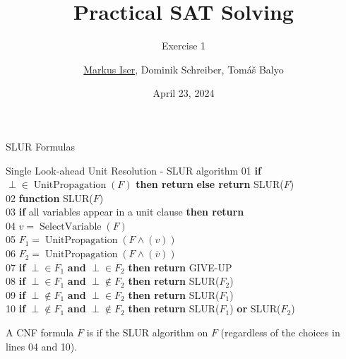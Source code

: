 \documentclass[t]{sdqbeamer}
\title[SAT Solving]{Practical SAT Solving}
\subtitle{Exercise 1}
\author{\underline{Markus Iser}, Dominik Schreiber, Tom\'a\v{s} Balyo}
\date{April 23, 2024}
\begin{document}
\begin{frame}
	\thispagestyle{empty}
	\titlepage
\end{frame}

\begin{frame}{SLUR Formulas}
	\begin{block}{Single Look-ahead Unit Resolution - SLUR algorithm}
		01 \textbf{if} $\perp \in \operatorname{UnitPropagation}(F)$ \textbf{then return}  \textbf{else return} SLUR($F$)\\
		\vspace{0.5em}
		02 \textbf{function} SLUR($F$)\\
		03 \hspace{1em} \textbf{if} all variables appear in a unit clause \textbf{then return} \\
		04 \hspace{1em} $v = \operatorname{SelectVariable}(F)$\\
		05 \hspace{1em} $F_1 = \operatorname{UnitPropagation}(F \wedge (v))$\\
		06 \hspace{1em} $F_2 = \operatorname{UnitPropagation}(F \wedge (\overline{v}))$\\
		07 \hspace{1em} \textbf{if} $\perp \in F_1$ \textbf{and} $\perp \in F_2$ \textbf{then return} {\highlo GIVE-UP}\\
		08 \hspace{1em} \textbf{if} $\perp \in F_1$ \textbf{and} $\perp \notin F_2$ \textbf{then return} SLUR($F_2$)\\
		09 \hspace{1em} \textbf{if} $\perp \notin F_1$ \textbf{and} $\perp \in F_2$ \textbf{then return} SLUR($F_1$)\\
		10 \hspace{1em} \textbf{if} $\perp \notin F_1$ \textbf{and} $\perp \notin F_2$ \textbf{then return} SLUR($F_1$)
		\textbf{or} SLUR($F_2$)\\
	\end{block}
	A CNF formula $F$ is  if the SLUR algorithm  on $F$ (regardless of the choices
	in lines 04 and 10).
\end{frame}
\end{document}
